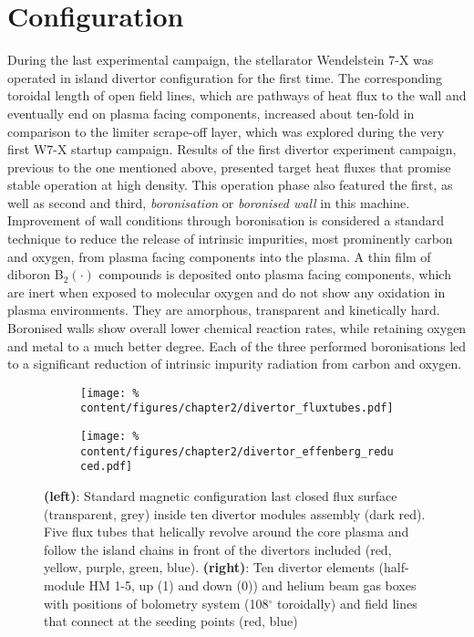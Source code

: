     \section{Configuration}\label{sec:configuration}%
%
        During the last experimental campaign, the stellarator Wendelstein 7-X was operated in island divertor configuration for the first time. The corresponding toroidal length of open field lines, which are pathways of heat flux to the wall and eventually end on plasma facing components, increased about ten-fold in comparison to the limiter scrape-off layer, which was explored during the very first W7-X startup campaign. Results of the first divertor experiment campaign, previous to the one mentioned above, presented target heat fluxes that promise stable operation at high density\cite{Pedersen2018}. This operation phase also featured the first, as well as second and third, \textit{boronisation} or \textit{boronised wall} in this machine. Improvement of wall conditions through boronisation is considered a standard technique to reduce the release of intrinsic impurities, most prominently carbon and oxygen, from plasma facing components into the plasma\cite{Winter1989,Winter1992,Meshcheryakov2005,Bedoya2018,Waelbroeck1989,Lipschultz2007}. A thin film of diboron B$_{2}\left(\cdot\right)$ compounds is deposited onto plasma facing components, which are inert when exposed to molecular oxygen and do not show any oxidation in plasma environments. They are amorphous, transparent and kinetically hard. Boronised walls show overall lower chemical reaction rates, while retaining oxygen and metal to a much better degree\cite{Winter1992}. Each of the three performed boronisations led to a significant reduction of intrinsic impurity radiation from carbon and oxygen\cite{Buttenschon2019}.\\%
%
        \begin{figure}[t]%
            \centering%
            \begin{subfigure}{0.4\textwidth}%
                \texttt{[image: \%
                    content/figures/chapter2/divertor\_fluxtubes.pdf]}%
            \end{subfigure}%
            \hfill%
            \begin{subfigure}{0.56\textwidth}%
                \texttt{[image: \%
                    content/figures/chapter2/divertor\_effenberg\_reduced.pdf]}%
            \end{subfigure}%
            \caption{\textbf{(left)}: Standard magnetic configuration last closed flux surface (transparent, grey) inside ten divertor modules assembly (dark red). Five flux tubes that helically revolve around the core plasma and follow the island chains in front of the divertors included (red, yellow, purple, green, blue)\cite{Reimold2021}. \textbf{(right)}: Ten divertor elements (half-module HM 1-5, up (1) and down (0)) and helium beam gas boxes with positions of bolometry system (108$^{\circ}$ toroidally) and field lines that connect at the seeding points (red, blue)\cite{Effenberg2019_seed}}\label{fig:divertors_fluxtubes}%
        \end{figure}%
